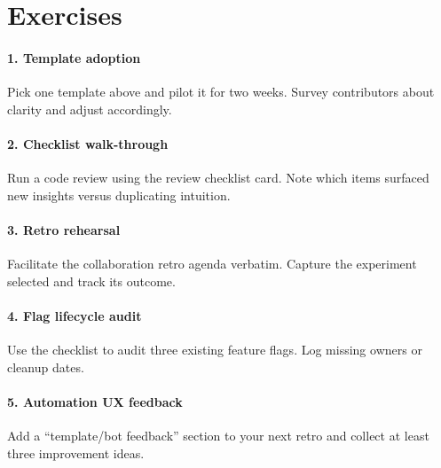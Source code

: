 \section*{Exercises}

\paragraph{1. Template adoption} Pick one template above and pilot it for two weeks. Survey contributors about clarity and adjust accordingly.

\paragraph{2. Checklist walk-through} Run a code review using the review checklist card. Note which items surfaced new insights versus duplicating intuition.

\paragraph{3. Retro rehearsal} Facilitate the collaboration retro agenda verbatim. Capture the experiment selected and track its outcome.

\paragraph{4. Flag lifecycle audit} Use the checklist to audit three existing feature flags. Log missing owners or cleanup dates.

\paragraph{5. Automation UX feedback} Add a ``template/bot feedback'' section to your next retro and collect at least three improvement ideas.
